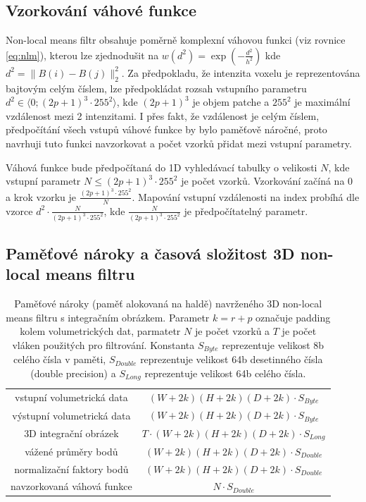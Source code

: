 \subsection*{Vzorkování váhové funkce}
\label{subsec:nlm:sampling}
Non-local means filtr obsahuje poměrně komplexní váhovou funkci (viz rovnice \ref{eq:nlm}), kterou lze zjednodušit na $w(d^2) = \exp(-\frac{d^2}{h^2})$ kde $d^2 = \|B(i) - B(j)\|_2^2$. Za předpokladu, že intenzita voxelu je reprezentována bajtovým celým číslem, lze předpokládat rozsah vstupního parametru $d^2 \in \langle0;(2p + 1)^3 \cdot 255^2\rangle$, kde $(2p + 1)^3$ je objem patche a $255^2$ je maximální  vzdálenost mezi 2 intenzitami. I přes fakt, že vzdálenost je celým číslem, předpočítání všech vstupů váhové funkce by bylo paměťově náročné, proto navrhuji tuto funkci navzorkovat a počet vzorků přidat mezi vstupní parametry.

Váhová funkce bude předpočítaná do 1D vyhledávací tabulky o velikosti $N$, kde vstupní parametr $N \leq (2p + 1)^3 \cdot 255^2$ je počet vzorků. Vzorkování začíná na $0$ a krok vzorku je $\frac{(2p + 1)^3 \cdot 255^2}{N}$. Mapování vstupní vzdálenosti na index probíhá dle vzorce $d^2 \cdot \frac{N}{(2p + 1)^3 \cdot 255^2}$, kde $\frac{N}{(2p + 1)^3 \cdot 255^2}$ je předpočítatelný parametr.

\subsection*{Paměťové nároky a časová složitost 3D non-local means filtru}
\begin{table} [H]
    \centering
    \begin{tabular}{|c|c|}
        \hline
        vstupní volumetrická data & $(W + 2k)(H + 2k)(D + 2k) \cdot S_{Byte}$ \\
        výstupní volumetrická data & $(W + 2k)(H + 2k)(D + 2k)
        \cdot S_{Byte}$ \\
        \hline
        3D integrační obrázek & $T \cdot (W + 2k)(H + 2k)(D + 2k) \cdot S_{Long}$ \\
        vážené průměry bodů & $(W + 2k)(H + 2k)(D + 2k) \cdot S_{Double}$ \\
        normalizační faktory bodů & $(W + 2k)(H + 2k)(D + 2k) \cdot S_{Double}$ \\
        navzorkovaná váhová funkce & $N \cdot S_{Double}$ \\
        \hline
    \end{tabular}
    \caption{Paměťové nároky (paměť alokovaná na haldě) navrženého 3D non-local means filtru s integračním obrázkem. Parametr $k = r + p$ označuje padding kolem volumetrických dat, parmatetr $N$ je počet vzorků a $T$ je počet vláken použitých pro filtrování. Konstanta $S_{Byte}$ reprezentuje velikost 8b celého čísla v paměti, $S_{Double}$ reprezentuje velikost 64b desetinného čísla (double precision) a $S_{Long}$ reprezentuje velikost 64b celého čísla.}
\end{table}

